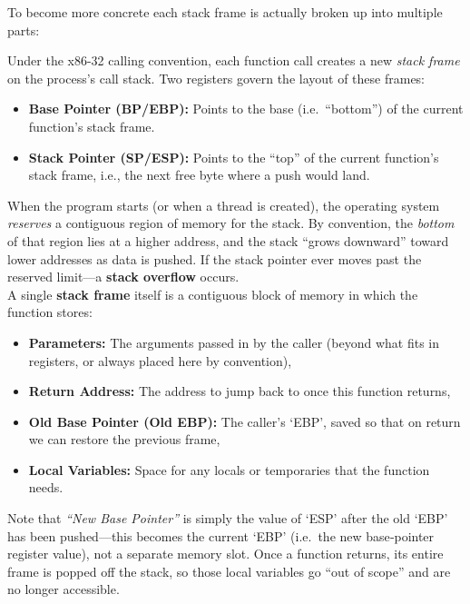\newpage 
\noindent
To become more concrete each stack frame is actually broken up into multiple parts:
\begin{Def}

Under the x86-32 calling convention, each function call creates a new \emph{stack frame} on the process's call stack. Two registers govern the layout of these frames:
\begin{itemize}
  \item \textbf{Base Pointer (BP/EBP):} Points to the base (i.e.\ ``bottom'') of the current function's stack frame.
  \item \textbf{Stack Pointer (SP/ESP):} Points to the ``top'' of the current function's stack frame, i.e., the next free byte where a push would land.
\end{itemize}

\noindent
When the program starts (or when a thread is created), the operating system \emph{reserves} a contiguous region of memory for the stack. By convention, the \emph{bottom} of that region lies at a higher address, 
and the stack ``grows downward'' toward lower addresses as data is pushed. If the stack pointer ever moves past the reserved limit---a \textbf{stack overflow} occurs.
\\

\noindent
A single \textbf{stack frame} itself is a contiguous block of memory in which the function stores:
\begin{itemize}
  \item \textbf{Parameters:} The arguments passed in by the caller (beyond what fits in registers, or always placed here by convention),  
  \item \textbf{Return Address:} The address to jump back to once this function returns,  
  \item \textbf{Old Base Pointer (Old EBP):} The caller's `EBP', saved so that on return we can restore the previous frame,  
  \item \textbf{Local Variables:} Space for any locals or temporaries that the function needs.  
\end{itemize}
Note that \emph{``New Base Pointer''} is simply the value of `ESP' after the old `EBP' has been pushed—this becomes the current `EBP' (i.e.\ the new base‐pointer register value), not a separate memory slot. Once a function returns, its entire frame is popped off the stack, so those local variables go ``out of scope'' and are no longer accessible.
\end{Def}

